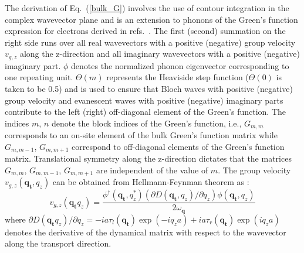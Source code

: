 \documentclass[11pt]{article}
\begin{document}
The derivation of Eq.~(\ref{bulk_G}) involves the use of contour integration in the complex wavevector plane and is an extension to phonons of the Green's function expression for electrons derived in refs.~\cite{allen1979green,chang1982complex}. The first (second) summation on the right side runs over all real wavevectors with a positive (negative) group velocity $v_{g,z}$ along the z-direction and all imaginary wavevectors with a positive (negative) imaginary part. $\phi$ denotes the normalized phonon eigenvector corresponding to one repeating unit. $\Theta(m)$ represents the Heaviside step function ($\Theta(0)$ is taken to be 0.5) and is used to ensure that Bloch waves with positive (negative) group velocity and evanescent waves with positive (negative) imaginary parts contribute to the left (right) off-diagonal element of the Green's function. The indices $m$, $n$ denote the block indices of the Green's function, i.e., $G_{m,m}$ corresponds to an on-site element of the bulk Green's function matrix while $G_{m,m-1}$, $G_{m,m+1}$ correspond to off-diagonal elements of the Green's function matrix. Translational symmetry along the z-direction dictates that the matrices $G_{m,m}$, $G_{m,m-1}$, $G_{m,m+1}$ are independent of the value of $m$. The group velocity $v_{g,z}(\boldsymbol{q_{t}},q_z)$ can be obtained from Hellmann-Feynman theorem as \cite{mcgaughey2014predicting}:
\begin{equation}
v_{g,z}(\boldsymbol{q_{t}}q_z) = \frac{\phi^\dagger(\boldsymbol{q_{t}},q_z^*)\left(\partial D(\boldsymbol{q_{t}},q_z)/\partial q_z\right)\phi(\boldsymbol{q_{t}},q_z)}{2\omega_{\boldsymbol{q}}}
\end{equation}
where $\partial D(\boldsymbol{q_{t}}q_z)/\partial q_z = -ia\tau_l(\boldsymbol{q_{t}})\exp{(-iq_za)}+ia\tau_r(\boldsymbol{q_{t}})\exp{(iq_za)}$ denotes the derivative of the dynamical matrix with respect to the wavevector along the transport direction. 
\end{document}
